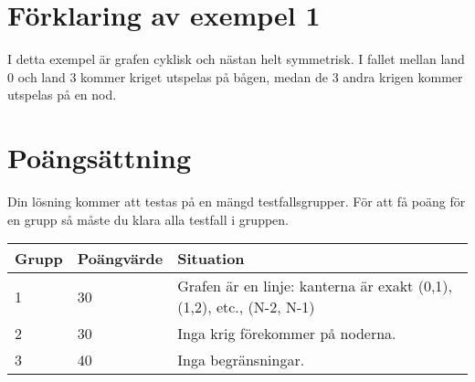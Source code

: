 \section*{Förklaring av exempel 1}

I detta exempel är grafen cyklisk och nästan helt symmetrisk. I fallet mellan
land 0 och land 3 kommer kriget utspelas på bågen, medan de 3 andra krigen
kommer utspelas på en nod.

\section*{Poängsättning}

Din lösning kommer att testas på en mängd testfallsgrupper. För att få poäng för en grupp
så måste du klara alla testfall i gruppen.

\begin{tabular}{| l | l | l |}
\hline
Grupp & Poängvärde & Situation \\ \hline
1     & 30         & Grafen är en linje: kanterna är exakt (0,1), (1,2), etc., (N-2, N-1) \\ \hline
2     & 30         & Inga krig förekommer på noderna. \\ \hline
3     & 40         & Inga begränsningar. \\ \hline
\end{tabular}
